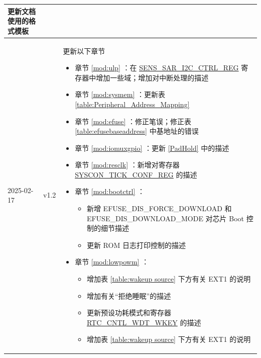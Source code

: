\begin{longtable}[l]{ | m{2cm} | m{1.5cm} | m{12cm} | }
    更新文档使用的格式模板
    \\\hline
    2025-02-17 & v1.2 &
    更新以下章节
    \begin{itemize}
        \item 章节 \ref{mod:ulp} \textit{\nameref{mod:ulp}}：在 \hyperref[regdesc:SENSSARI2CCTRLREG]{SENS\_SAR\_I2C\_CTRL\_REG} 寄存器中增加一些域；增加对中断处理的描述 %
        \item 章节 \ref{mod:sysmem} \textit{\nameref{mod:sysmem}}：更新表 \ref{table:Peripheral_Address_Mapping} %
        \item 章节 \ref{mod:efuse} \textit{\nameref{mod:efuse}}：修正笔误；修正表 \ref{table:efusebaseaddress} \textit{\nameref{table:efusebaseaddress}} 中基地址的错误 %
        \item 章节 \ref{mod:iomuxgpio} \textit{\nameref{mod:iomuxgpio}}：更新 \ref{PadHold} 中的描述 %
        \item 章节 \ref{mod:resclk} \textit{\nameref{mod:resclk}}：新增对寄存器 \hyperref[regdesc:SYSCONTICKCONFREG]{SYSCON\_TICK\_CONF\_REG} 的描述 %
        \item 章节 \ref{mod:bootctrl} \textit{\nameref{mod:bootctrl}}：
        \begin{itemize}
        \item 新增 EFUSE\_DIS\_FORCE\_DOWNLOAD 和 EFUSE\_DIS\_DOWNLOAD\_MODE 对芯片 Boot 控制的细节描述 %
        \item 更新 ROM 日志打印控制的描述 %
        \end{itemize}
        \item 章节 \ref{mod:lowpowm} \textit{\nameref{mod:lowpowm}}：
            \begin{itemize}
                \item 增加表 \ref{table:wakeup source} 下方有关 EXT1 的说明 %
                \item 增加有关“拒绝睡眠”的描述 %
                \item 更新预设功耗模式和寄存器 \hyperref[fielddesc:RTCCNTLWDTWKEY]{RTC\_CNTL\_WDT\_WKEY} 的描述 %
                \item 增加表 \ref{table:wakeup source} 下方有关 EXT1 的说明 %
            \end{itemize}


\end{itemize}
\end{longtable}
